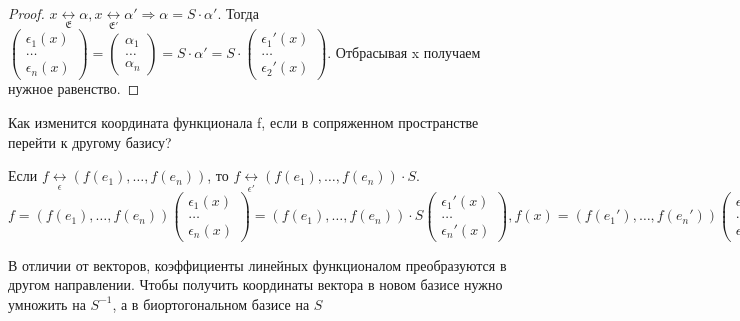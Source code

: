 \begin{proof}
	\(x\underset{\mathfrak{E}}{\longleftrightarrow}\alpha, x\underset{\mathfrak{E}'}{\longleftrightarrow}\alpha' \Longrightarrow \alpha = S\cdot \alpha'\). Тогда \(\begin{pmatrix}
		\epsilon_1(x) \\ \ldots \\ \epsilon_n(x)
	\end{pmatrix}=\begin{pmatrix}
	\alpha_1 \\ \ldots \\ \alpha_n
	\end{pmatrix} = S\cdot \alpha ' = S\cdot\begin{pmatrix}
	\epsilon_1'(x) \\ \ldots \\ \epsilon_2'(x)
	\end{pmatrix}\). Отбрасывая x получаем нужное равенство.
\end{proof}
Как изменится координата функционала f, если в сопряженном пространстве перейти к другому базису?
\begin{corollary}
	Если \(f \underset{\mathfrak{\epsilon}}{\longleftrightarrow}(f(e_1), \ldots, f(e_n))\), то \(f\underset{\mathfrak{\epsilon}'}{\longleftrightarrow}(f(e_1), \ldots, f(e_n))\cdot S\).\newline \(f = (f(e_1), \ldots, f(e_n))\begin{pmatrix}
		\epsilon_1(x) \\ \ldots \\ \epsilon_n(x)
	\end{pmatrix} = (f(e_1), \ldots, f(e_n))\cdot S\begin{pmatrix}
	\epsilon_1'(x) \\ \ldots \\ \epsilon_n'(x)
	\end{pmatrix}, f(x)= (f(e_1'), \ldots, f(e_n'))\begin{pmatrix}
	\epsilon_1'(x) \\ \ldots \\ \epsilon_n'(x)
	\end{pmatrix}\)
\end{corollary}
В отличии от векторов, коэффициенты линейных функционалом преобразуются в другом направлении. Чтобы получить координаты вектора в новом базисе нужно умножить на \(S^{-1}\), а в биортогональном базисе на \(S\)

